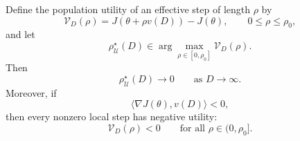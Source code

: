\documentclass[sigconf,anonymous,review]{acmart}
\theoremstyle{acmdefinition}
\begin{document}
\begin{lemma}
Define the population utility of an effective step of length \(\rho\) by
\begin{equation}
    \mathcal V_D(\rho)
    =
    J\!\left(
        \theta+\rho v(D)
    \right)
    -
    J(\theta),
    \qquad
    0\leq\rho\leq\rho_0,
    \label{eq:effective_step_utility}
\end{equation}
and let
\begin{equation}
    \rho_{\mathcal U}^{\star}(D)
    \in
    \arg\max_{\rho\in[0,\rho_0]}
    \mathcal V_D(\rho).
    \label{eq:utility_optimal_effective_step}
\end{equation}
Then
\begin{equation}
    \rho_{\mathcal U}^{\star}(D)
    \longrightarrow 0
    \qquad
    \text{as }
    D\longrightarrow\infty.
    \label{eq:optimal_step_vanishes}
\end{equation}
Moreover, if
\[
    \langle\nabla J(\theta),v(D)\rangle<0,
\]
then every nonzero local step has negative utility:
\begin{equation}
    \mathcal V_D(\rho)<0
    \qquad
    \text{for all }
    \rho\in(0,\rho_0].
    \label{eq:negative_far_field_utility}
\end{equation}
\end{lemma}
\end{document}
